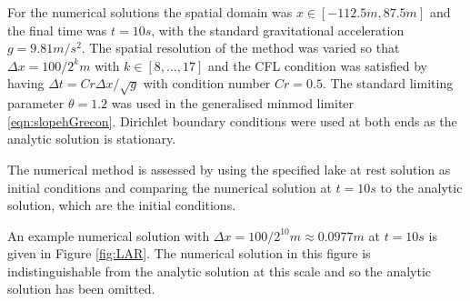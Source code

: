 \documentclass[times]{elsarticle}
\begin{document}
For the numerical solutions the spatial domain was $x \in \left[-112.5 m,87.5 m\right]$ and the final time was $t=10s$, with the standard gravitational acceleration $g= 9.81 m/s^2$. The spatial resolution of the method was varied so that $\Delta x = 100 / 2^k m$ with $k \in \left[8, \dots ,17\right]$ and the CFL condition \cite{Courant-etal-1967-215} was satisfied by having $\Delta t = Cr \Delta x / \sqrt{g}$ with condition number $Cr = 0.5$. The standard limiting parameter $\theta = 1.2$ was used in the generalised minmod limiter \eqref{eqn:slopehGrecon}. Dirichlet boundary conditions were used at both ends as the analytic solution is stationary.

The numerical method is assessed by using the specified lake at rest solution as initial conditions and comparing the numerical solution at $t=10s$ to the analytic solution, which are the initial conditions.

An example numerical solution with $\Delta x = 100/2^{10}m \approx 0.0977m$ at $t=10s$ is given in Figure \ref{fig:LAR}. The numerical solution in this figure is indistinguishable from the analytic solution at this scale and so the analytic solution has been omitted. 
\end{document}
